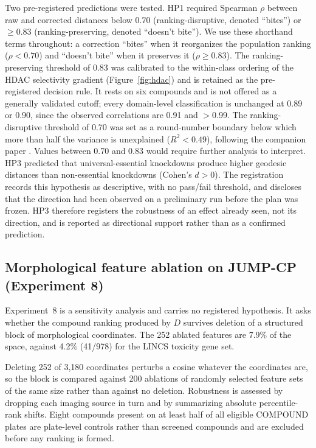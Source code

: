 \documentclass[11pt]{article}
\begin{document}
Two pre-registered predictions were tested.
HP1 required Spearman $\rho$ between raw and corrected distances below
0.70 (ranking-disruptive, denoted ``bites'') or $\geq 0.83$
(ranking-preserving, denoted ``doesn't bite''). We use these shorthand
terms throughout: a correction ``bites'' when it reorganizes the
population ranking ($\rho < 0.70$) and ``doesn't bite'' when it
preserves it ($\rho \geq 0.83$). The ranking-preserving threshold of
0.83 was calibrated to the within-class ordering of the HDAC selectivity
gradient (Figure~\ref{fig:hdac}) and is retained as the pre-registered
decision rule. It rests on six compounds and is not offered as a generally
validated cutoff; every domain-level classification is unchanged at 0.89
or 0.90, since the observed correlations are 0.91 and $>$0.99. The ranking-disruptive threshold of 0.70 was set as a
round-number boundary below which more than half the variance is
unexplained ($R^2 < 0.49$), following the companion paper
\citep{tower2026drug}. Values between 0.70 and 0.83 would require
further analysis to interpret.
HP3 predicted that universal-essential knockdowns produce higher geodesic
distances than non-essential knockdowns (Cohen's $d > 0$). The registration
records this hypothesis as descriptive, with no pass/fail threshold, and
discloses that the direction had been observed on a preliminary run before
the plan was frozen. HP3 therefore registers the robustness of an effect
already seen, not its direction, and is reported as directional support
rather than as a confirmed prediction.

\subsection{Morphological feature ablation on JUMP-CP (Experiment 8)}

Experiment~8 is a sensitivity analysis and carries no registered hypothesis.
It asks whether the compound ranking produced by $D$ survives deletion of a
structured block of morphological coordinates. The 252 ablated features are
7.9\% of the space, against 4.2\% (41/978) for the LINCS toxicity gene set.

Deleting 252 of 3{,}180 coordinates perturbs a cosine whatever the
coordinates are, so the block is compared against 200 ablations of randomly
selected feature sets of the same size rather than against no deletion.
Robustness is assessed by dropping each imaging source in turn and by
summarizing absolute percentile-rank shifts. Eight compounds present on at
least half of all eligible COMPOUND plates are plate-level controls rather
than screened compounds and are excluded before any ranking is formed.
\end{document}
